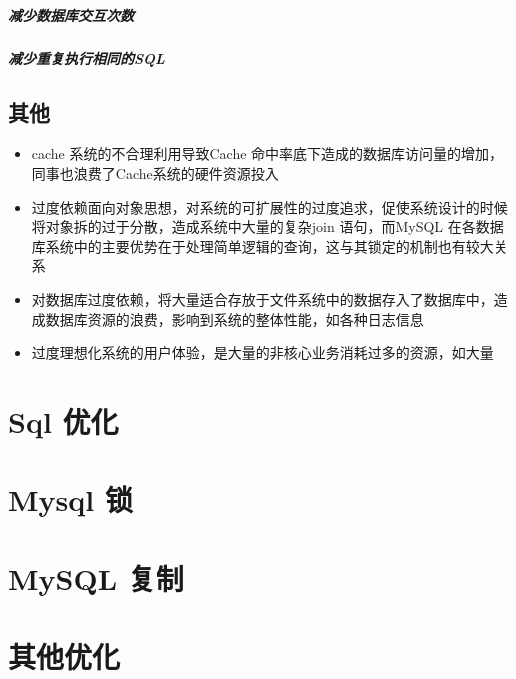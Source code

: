 \documentclass[UTF8,a4paper,12pt]{ctexbook}
\begin{document}
		\subparagraph{减少数据库交互次数}
		\subparagraph{减少重复执行相同的SQL}
	
		\subsection{其他}
			\begin{itemize}
				\item cache 系统的不合理利用导致Cache 命中率底下造成的数据库访问量的增加，同事也浪费了Cache系统的硬件资源投入
				\item 过度依赖面向对象思想，对系统的可扩展性的过度追求，促使系统设计的时候将对象拆的过于分散，造成系统中大量的复杂join 语句，而MySQL 在各数据库系统中的主要优势在于处理简单逻辑的查询，这与其锁定的机制也有较大关系
				\item 对数据库过度依赖，将大量适合存放于文件系统中的数据存入了数据库中，造成数据库资源的浪费，影响到系统的整体性能，如各种日志信息
				\item 过度理想化系统的用户体验，是大量的非核心业务消耗过多的资源，如大量
			\end{itemize}
			
	\section{Sql 优化}	
	
	\section{Mysql 锁}
		
	\section{MySQL 复制}
	
	\section{其他优化}
		    
\end{document}
